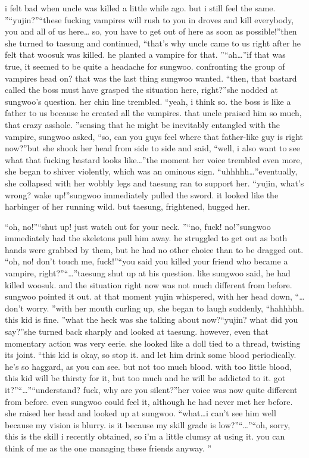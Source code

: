 i felt bad when uncle was killed a little while ago.
 but i still feel the same.
”“yujin?”“these fucking vampires will rush to you in droves and kill everybody, you and all of us here… so, you have to get out of here as soon as possible!”then she turned to taesung and continued, “that’s why uncle came to us right after he felt that woosuk was killed.
 he planted a vampire for that.
”“ah…”if that was true, it seemed to be quite a headache for sungwoo.
confronting the group of vampires head on? that was the last thing sungwoo wanted.
“then, that bastard called the boss must have grasped the situation here, right?”she nodded at sungwoo’s question.
 her chin line trembled.
“yeah, i think so.
 the boss is like a father to us because he created all the vampires.
 that uncle praised him so much, that crazy asshole.
”sensing that he might be inevitably entangled with the vampire, sungwoo asked, “so, can you guys feel where that father-like guy is right now?”but she shook her head from side to side and said, “well, i also want to see what that fucking bastard looks like…”the moment her voice trembled even more, she began to shiver violently, which was an ominous sign.
“uhhhhh…”eventually, she collapsed with her wobbly legs and taesung ran to support her.
“yujin, what’s wrong? wake up!”sungwoo immediately pulled the sword.
 it looked like the harbinger of her running wild.
but taesung, frightened, hugged her.


“oh, no!”“shut up! just watch out for your neck.
”“no, fuck! no!”sungwoo immediately had the skeletons pull him away.
 he struggled to get out as both hands were grabbed by them, but he had no other choice than to be dragged out.
“oh, no! don’t touch me, fuck!”“you said you killed your friend who became a vampire, right?”“…”taesung shut up at his question.
 like sungwoo said, he had killed woosuk.
and the situation right now was not much different from before.
 sungwoo pointed it out.
at that moment yujin whispered, with her head down, “…don’t worry.
”with her mouth curling up, she began to laugh suddenly, “hahhhhh.
 this kid is fine.
”what the heck was she talking about now?“yujin? what did you say?”she turned back sharply and looked at taesung.
 however, even that momentary action was very eerie.
 she looked like a doll tied to a thread, twisting its joint.
“this kid is okay, so stop it.
 and let him drink some blood periodically.
 he’s so haggard, as you can see.
 but not too much blood.
 with too little blood, this kid will be thirsty for it, but too much and he will be addicted to it.
 got it?”“…”“understand? fuck, why are you silent?”her voice was now quite different from before.
 even sungwoo could feel it, although he had never met her before.
 she raised her head and looked up at sungwoo.
“what…i can’t see him well because my vision is blurry.
 is it because my skill grade is low?”“…”“oh, sorry, this is the skill i recently obtained, so i’m a little clumsy at using it.
 you can think of me as the one managing these friends anyway.
”

 